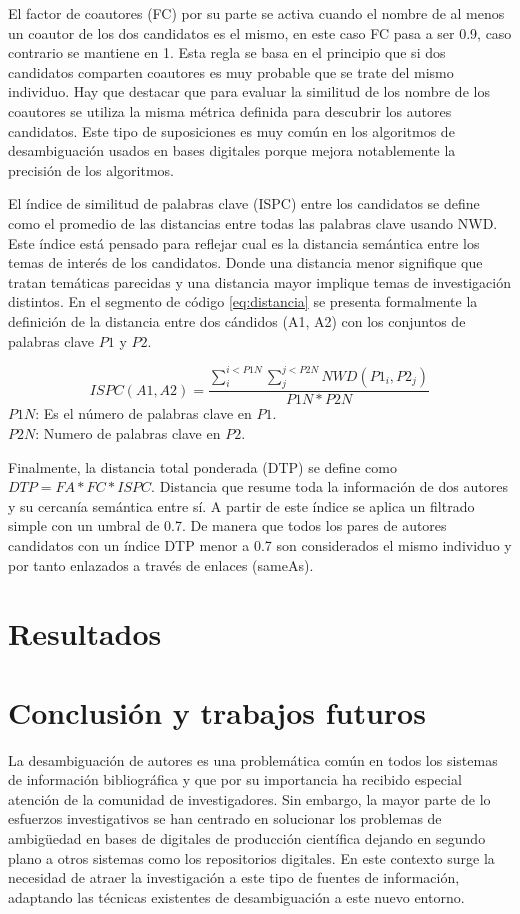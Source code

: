 \documentclass[conference]{IEEEtran}
\begin{document}
El factor de coautores (FC) por su parte se activa cuando el nombre de al menos un coautor de los dos candidatos es el mismo, en este caso FC pasa a ser 0.9, caso contrario se mantiene en 1. Esta regla se basa en el principio que si dos candidatos comparten coautores es muy probable que se trate del mismo individuo. Hay que destacar que para evaluar la similitud de los nombre de los coautores se utiliza la misma métrica definida para descubrir los autores candidatos. Este tipo de suposiciones es muy común en los algoritmos de desambiguación usados en bases digitales porque mejora notablemente la precisión de los algoritmos.

El índice de similitud de palabras clave (ISPC) entre los candidatos se define como el promedio de las distancias entre todas las palabras clave usando NWD. Este índice está pensado para reflejar cual es la distancia semántica entre los temas de interés de los candidatos. Donde una distancia menor signifique que tratan temáticas parecidas y una distancia mayor implique temas de investigación distintos. En el segmento de código \ref{eq:distancia} se presenta formalmente la definición de la distancia entre dos cándidos (A1, A2) con los conjuntos de  palabras clave $P1$ y $P2$.

\begin{equation}\label{eq:distancia}
ISPC(A1,A2) = \frac{\sum_i^{i<P1N}\sum_j^{j<P2N}NWD(P1_i, P2_j)}{P1N*P2N}
\end{equation}
$P1N$: Es el número de palabras clave en $P1$.\\
$P2N$: Numero de palabras clave en $P2$.

Finalmente, la distancia total ponderada (DTP) se define como $DTP= FA*FC*ISPC$. Distancia que resume toda la información de dos autores y su cercanía semántica entre sí. A partir de este índice se aplica un filtrado simple con un umbral de 0.7. De manera que todos los pares de autores candidatos con un índice DTP menor a 0.7 son considerados el mismo individuo y por tanto enlazados a través de enlaces (sameAs).
\section{Resultados}
\label{sec:resultados}

\section{Conclusión y trabajos futuros}
\label{sec:conclusion}
La desambiguación de autores es una problemática común en todos los sistemas de información bibliográfica y que por su importancia ha recibido especial atención de la comunidad de investigadores. Sin embargo, la mayor parte de lo esfuerzos investigativos se han centrado en solucionar los problemas de ambigüedad en bases de digitales de producción científica dejando   en segundo plano a otros sistemas como los repositorios digitales. En este contexto surge la necesidad de atraer la investigación a este tipo de fuentes de información, adaptando las técnicas existentes de desambiguación a este nuevo entorno.
\end{document}
